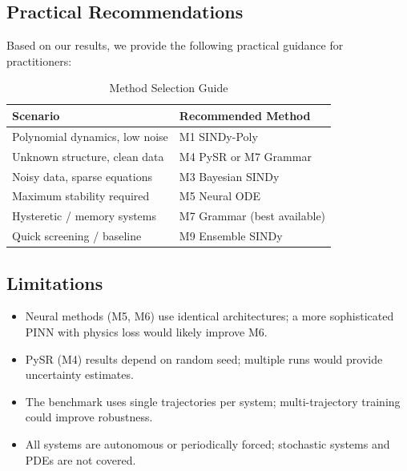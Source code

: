 \subsection{Practical Recommendations}

Based on our results, we provide the following practical guidance for practitioners:

\begin{table}[!ht]
\centering
\caption{Method Selection Guide}
\label{tab:recommendations}
\begin{tabular}{@{}ll@{}}
\toprule
\textbf{Scenario} & \textbf{Recommended Method} \\
\midrule
Polynomial dynamics, low noise & M1 SINDy-Poly \\
Unknown structure, clean data & M4 PySR or M7 Grammar \\
Noisy data, sparse equations & M3 Bayesian SINDy \\
Maximum stability required & M5 Neural ODE \\
Hysteretic / memory systems & M7 Grammar (best available) \\
Quick screening / baseline & M9 Ensemble SINDy \\
\bottomrule
\end{tabular}
\end{table}

\subsection{Limitations}
\begin{itemize}
    \item Neural methods (M5, M6) use identical architectures; a more sophisticated PINN with physics loss would likely improve M6.
    \item PySR (M4) results depend on random seed; multiple runs would provide uncertainty estimates.
    \item The benchmark uses single trajectories per system; multi-trajectory training could improve robustness.
    \item All systems are autonomous or periodically forced; stochastic systems and PDEs are not covered.
\end{itemize}

